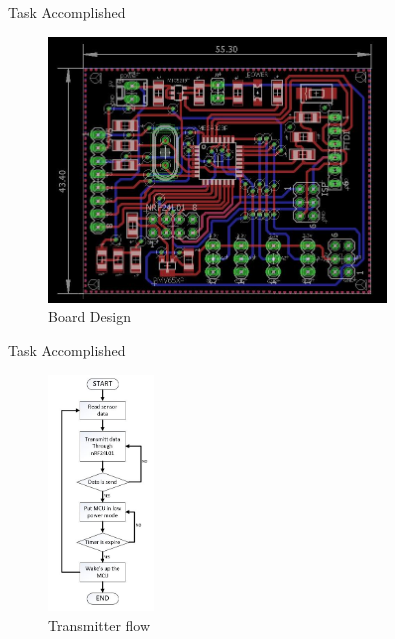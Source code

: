 \documentclass[10pt, a4paper]{beamer}
\begin{document}
\begin{frame}{Task Accomplished}
\begin{figure}
\begin{center}
\includegraphics[width=0.8\textwidth]{eagle_board_snap.JPG}
\caption{Board Design}
\end{center}
\end{figure}
\end {frame}

\begin{frame}{Task Accomplished}
\begin{figure}
\begin{center}
\includegraphics[width=0.25\textwidth]{trance_flow_snap.JPG}
\caption{Transmitter flow}
\end{center}
\end{figure}
\end {frame}
\end{document}
